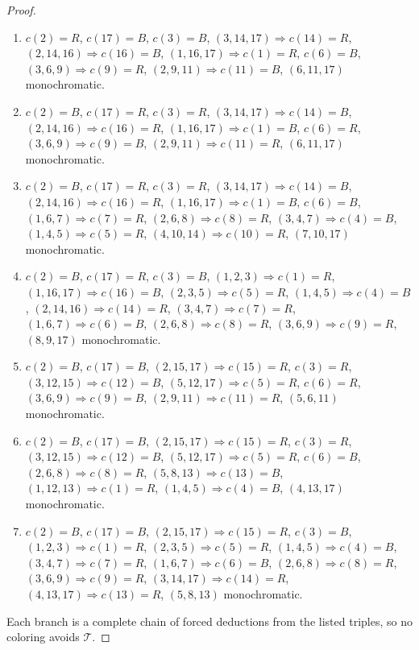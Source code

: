 \documentclass[11pt]{article}
\theoremstyle{remark}
\begin{document}
\begin{proof}
\begin{enumerate}
\item \textbf{$c(2)=R$}, \textbf{$c(17)=B$}, \textbf{$c(3)=B$}, $(3,14,17)\Rightarrow c(14)=R$, $(2,14,16)\Rightarrow c(16)=B$, $(1,16,17)\Rightarrow c(1)=R$, \textbf{$c(6)=B$}, $(3,6,9)\Rightarrow c(9)=R$, $(2,9,11)\Rightarrow c(11)=B$, $(6,11,17)$ monochromatic.
\item \textbf{$c(2)=B$}, \textbf{$c(17)=R$}, \textbf{$c(3)=R$}, $(3,14,17)\Rightarrow c(14)=B$, $(2,14,16)\Rightarrow c(16)=R$, $(1,16,17)\Rightarrow c(1)=B$, \textbf{$c(6)=R$}, $(3,6,9)\Rightarrow c(9)=B$, $(2,9,11)\Rightarrow c(11)=R$, $(6,11,17)$ monochromatic.
\item \textbf{$c(2)=B$}, \textbf{$c(17)=R$}, \textbf{$c(3)=R$}, $(3,14,17)\Rightarrow c(14)=B$, $(2,14,16)\Rightarrow c(16)=R$, $(1,16,17)\Rightarrow c(1)=B$, \textbf{$c(6)=B$}, $(1,6,7)\Rightarrow c(7)=R$, $(2,6,8)\Rightarrow c(8)=R$, $(3,4,7)\Rightarrow c(4)=B$, $(1,4,5)\Rightarrow c(5)=R$, $(4,10,14)\Rightarrow c(10)=R$, $(7,10,17)$ monochromatic.
\item \textbf{$c(2)=B$}, \textbf{$c(17)=R$}, \textbf{$c(3)=B$}, $(1,2,3)\Rightarrow c(1)=R$, $(1,16,17)\Rightarrow c(16)=B$, $(2,3,5)\Rightarrow c(5)=R$, $(1,4,5)\Rightarrow c(4)=B$, $(2,14,16)\Rightarrow c(14)=R$, $(3,4,7)\Rightarrow c(7)=R$, $(1,6,7)\Rightarrow c(6)=B$, $(2,6,8)\Rightarrow c(8)=R$, $(3,6,9)\Rightarrow c(9)=R$, $(8,9,17)$ monochromatic.
\item \textbf{$c(2)=B$}, \textbf{$c(17)=B$}, $(2,15,17)\Rightarrow c(15)=R$, \textbf{$c(3)=R$}, $(3,12,15)\Rightarrow c(12)=B$, $(5,12,17)\Rightarrow c(5)=R$, \textbf{$c(6)=R$}, $(3,6,9)\Rightarrow c(9)=B$, $(2,9,11)\Rightarrow c(11)=R$, $(5,6,11)$ monochromatic.
\item \textbf{$c(2)=B$}, \textbf{$c(17)=B$}, $(2,15,17)\Rightarrow c(15)=R$, \textbf{$c(3)=R$}, $(3,12,15)\Rightarrow c(12)=B$, $(5,12,17)\Rightarrow c(5)=R$, \textbf{$c(6)=B$}, $(2,6,8)\Rightarrow c(8)=R$, $(5,8,13)\Rightarrow c(13)=B$, $(1,12,13)\Rightarrow c(1)=R$, $(1,4,5)\Rightarrow c(4)=B$, $(4,13,17)$ monochromatic.
\item \textbf{$c(2)=B$}, \textbf{$c(17)=B$}, $(2,15,17)\Rightarrow c(15)=R$, \textbf{$c(3)=B$}, $(1,2,3)\Rightarrow c(1)=R$, $(2,3,5)\Rightarrow c(5)=R$, $(1,4,5)\Rightarrow c(4)=B$, $(3,4,7)\Rightarrow c(7)=R$, $(1,6,7)\Rightarrow c(6)=B$, $(2,6,8)\Rightarrow c(8)=R$, $(3,6,9)\Rightarrow c(9)=R$, $(3,14,17)\Rightarrow c(14)=R$, $(4,13,17)\Rightarrow c(13)=R$, $(5,8,13)$ monochromatic.
\end{enumerate}
Each branch is a complete chain of forced deductions from the listed
triples, so no coloring avoids $\mathcal T$.
\end{proof}
\end{document}
